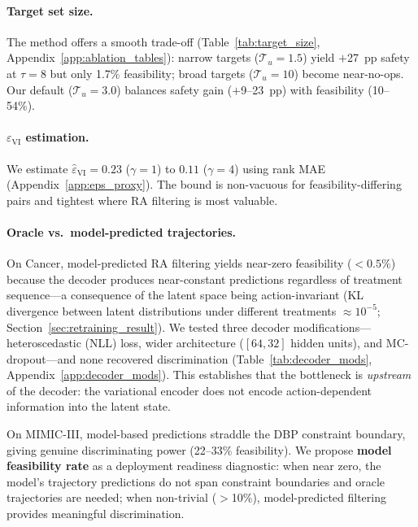 \documentclass{article}
\newcommand{\cT}{\mathcal{T}}
\begin{document}
\vspace{-0.8em}
\paragraph{Target set size.}
\label{sec:ablation_target}
The method offers a smooth trade-off (Table~\ref{tab:target_size}, Appendix~\ref{app:ablation_tables}): narrow targets ($\cT_u = 1.5$) yield $+$27~pp safety at $\tau = 8$ but only 1.7\% feasibility; broad targets ($\cT_u = 10$) become near-no-ops. Our default ($\cT_u = 3.0$) balances safety gain ($+$9--23~pp) with feasibility (10--54\%).

\vspace{-0.8em}
\paragraph{$\varepsilon_{\mathrm{VI}}$ estimation.}
\label{sec:ablation_eps}
We estimate $\hat{\varepsilon}_{\mathrm{VI}} = 0.23$ ($\gamma{=}1$) to $0.11$ ($\gamma{=}4$) using rank MAE (Appendix~\ref{app:eps_proxy}). The bound is non-vacuous for feasibility-differing pairs and tightest where RA filtering is most valuable.

\vspace{-0.8em}
\paragraph{Oracle vs.\ model-predicted trajectories.}
\label{sec:oracle_vs_model}
On Cancer, model-predicted RA filtering yields near-zero feasibility ($< 0.5\%$) because the decoder produces near-constant predictions regardless of treatment sequence---a consequence of the latent space being action-invariant (KL divergence between latent distributions under different treatments $\approx 10^{-5}$; Section~\ref{sec:retraining_result}). We tested three decoder modifications---heteroscedastic (NLL) loss, wider architecture ($[64, 32]$ hidden units), and MC-dropout---and none recovered discrimination (Table~\ref{tab:decoder_mods}, Appendix~\ref{app:decoder_mods}). This establishes that the bottleneck is \emph{upstream} of the decoder: the variational encoder does not encode action-dependent information into the latent state.

On MIMIC-III, model-based predictions straddle the DBP constraint boundary, giving genuine discriminating power (22--33\% feasibility). We propose \textbf{model feasibility rate} as a deployment readiness diagnostic: when near zero, the model's trajectory predictions do not span constraint boundaries and oracle trajectories are needed; when non-trivial ($>$10\%), model-predicted filtering provides meaningful discrimination.
\end{document}
